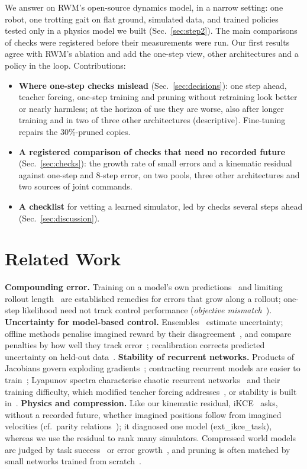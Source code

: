 We answer on RWM's open-source dynamics model, in a narrow setting: one robot, one trotting gait on flat ground,
simulated data, and trained policies tested only in a physics model we built (Sec.~\ref{sec:step2}). The main comparisons of checks were
registered before their measurements were run. Our first results agree with RWM's ablation and add the one-step view,
other architectures and a policy in the loop. Contributions:
\begin{itemize}
\item \textbf{Where one-step checks mislead} (Sec.~\ref{sec:decisions}): one step ahead, teacher forcing, one-step
training and pruning without retraining look better or nearly harmless; at the horizon of use they are worse, also
after longer training and in two of three other architectures (descriptive). Fine-tuning repairs the 30\%-pruned copies.
\item \textbf{A registered comparison of checks that need no recorded future} (Sec.~\ref{sec:checks}): the growth
rate of small errors and a kinematic residual against one-step and 8-step error, on two pools, three other
architectures and two sources of joint commands.
\item \textbf{A checklist} for vetting a learned simulator, led by checks several steps ahead (Sec.~\ref{sec:discussion}).
\end{itemize}

\section{Related Work}\label{sec:related}
\textbf{Compounding error.} Training on a model's own
predictions~\cite{bengio2015scheduled,venkatraman2015,talvitie2017,lambert2021} and limiting rollout
length~\cite{janner2019} are established remedies for errors that grow along a rollout; one-step likelihood need not
track control performance (\emph{objective mismatch}~\cite{lambert2020objective}).
\textbf{Uncertainty for model-based control.} Ensembles~\cite{lakshminarayanan2017,chua2018} estimate uncertainty;
offline methods penalise imagined reward by their disagreement~\cite{yu2020mopo,li2025rwmu}, and compare penalties by how well they track
error~\cite{lu2022}; recalibration corrects predicted uncertainty on held-out
data~\cite{kuleshov2018accurate,malik2019calibrated}.
\textbf{Stability of recurrent networks.} Products of Jacobians govern exploding
gradients~\cite{pascanu2013difficulty}; contracting recurrent models are easier to train~\cite{miller2019stable};
Lyapunov spectra characterise chaotic recurrent networks~\cite{engelken2024lyapunov} and their training difficulty,
which modified teacher forcing addresses~\cite{mikhaeil2022chaotic,hess2023generalized}, or stability is built
in~\cite{manek2019stable}.
\textbf{Physics and compression.} Like our kinematic residual, iKCE~\cite{schafer2026} asks, without a recorded future,
whether imagined positions follow from imagined velocities (cf.\ parity relations~\cite{isermann2005}); it diagnosed one
model ({{ext_ikce_task}}), whereas we use the residual to rank many simulators. Compressed world models are judged by task
success~\cite{fu2026} or error growth~\cite{pavlova2026}, and pruning is often matched by small networks trained from
scratch~\cite{liu2019rethinking}.

